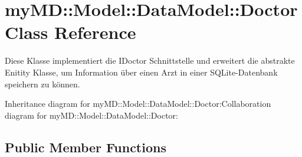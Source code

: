 \hypertarget{classmy_m_d_1_1_model_1_1_data_model_1_1_doctor}{
\section{my\-MD::Model::Data\-Model::Doctor Class Reference}
\label{db/d24/classmy_m_d_1_1_model_1_1_data_model_1_1_doctor}
}
Diese Klasse implementiert die IDoctor Schnittstelle und erweitert die abstrakte Enitity Klasse, um Information \"{u}ber einen Arzt in einer SQLite-Datenbank speichern zu k\"{o}nnen.  


Inheritance diagram for my\-MD::Model::Data\-Model::Doctor:Collaboration diagram for my\-MD::Model::Data\-Model::Doctor:\subsection*{Public Member Functions}
